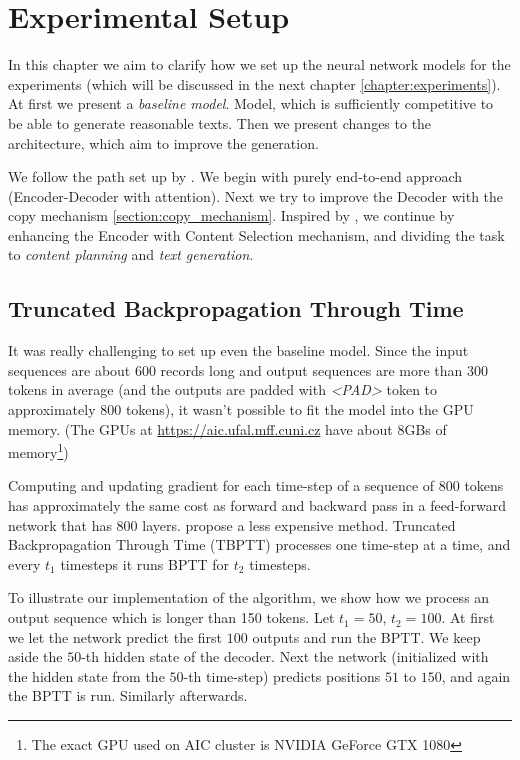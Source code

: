 \chapter{Experimental Setup} \label{chapter:experimental_setup}
In this chapter we aim to clarify how we set up the neural network models for the experiments (which will be discussed in the next chapter \ref{chapter:experiments}). At first we present a \emph{baseline model}. Model, which is sufficiently competitive to be able to generate reasonable texts. Then we present changes to the architecture, which aim to improve the generation.

We follow the path set up by \citet{wiseman2017}. We begin with purely end-to-end approach (Encoder-Decoder with attention). Next we try to improve the Decoder with the copy mechanism \ref{section:copy_mechanism}. Inspired by \citet{puduppully2019datatotext}, we continue by enhancing the Encoder with Content Selection mechanism, and dividing the task to \emph{content planning} and \emph{text generation}.

\section{Truncated Backpropagation Through Time} \label{section:truncated_backpropagation}

It was really challenging to set up even the baseline model. Since the input sequences are about 600 records long and output sequences are more than 300 tokens in average (and the outputs are padded with \emph{\textless PAD\textgreater} token to approximately 800 tokens), it wasn't possible to fit the model into the GPU memory. (The GPUs at \url{https://aic.ufal.mff.cuni.cz} have about 8GBs of memory\footnote{The exact GPU used on AIC cluster is NVIDIA GeForce GTX 1080})

Computing and updating gradient for each time-step of a sequence of 800 tokens has approximately the same cost as forward and backward pass in a feed-forward network that has 800 layers. \citet{williamsTBPTT} propose a less expensive method. Truncated Backpropagation Through Time (TBPTT) processes one time-step at a time, and every $t_1$ timesteps it runs BPTT for $t_2$ timesteps.

To illustrate our implementation of the algorithm, we show how we process an output sequence which is longer than 150 tokens. Let $t_1 = 50$, $t_2 = 100$. At first we let the network predict the first $100$ outputs and run the BPTT. We keep aside the $50$-th hidden state of the decoder. Next the network (initialized with the hidden state from the $50$-th time-step) predicts positions $51$ to $150$, and again the BPTT is run. Similarly afterwards.


